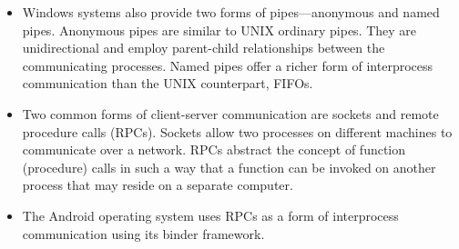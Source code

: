 \begin{itemize}
\item Windows systems also provide two forms of pipes---anonymous and named pipes. Anonymous pipes are similar to UNIX ordinary pipes. They are unidirectional and employ parent-child relationships between the communicating processes. Named pipes offer a richer form of interprocess communication than the UNIX counterpart, FIFOs.
\item Two common forms of client-server communication are sockets and remote procedure calls (RPCs). Sockets allow two processes on different machines to communicate over a network. RPCs abstract the concept of function (procedure) calls in such a way that a function can be invoked on another process that may reside on a separate computer.
\item The Android operating system uses RPCs as a form of interprocess communication using its binder framework.
\end{itemize}
